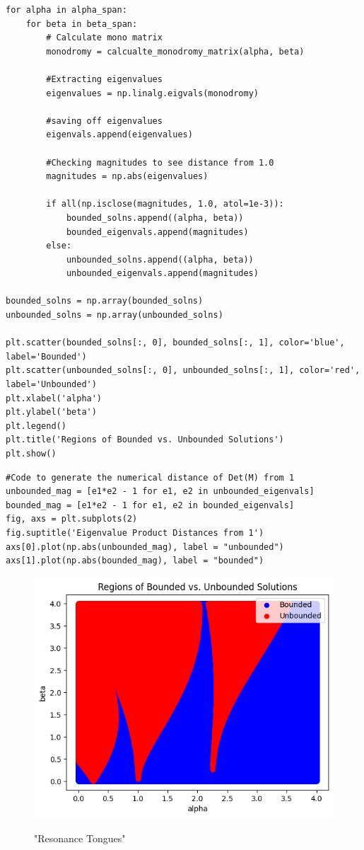 \documentclass[12pt]{article}
\newcommand{\jump}{\vspace{5mm}}
\begin{document}
\begin{enumerate}[]
\begin{lstlisting}
for alpha in alpha_span:
    for beta in beta_span:
        # Calculate mono matrix
        monodromy = calcualte_monodromy_matrix(alpha, beta)
        
        #Extracting eigenvalues
        eigenvalues = np.linalg.eigvals(monodromy)
        
        #saving off eigenvalues
        eigenvals.append(eigenvalues)
        
        #Checking magnitudes to see distance from 1.0
        magnitudes = np.abs(eigenvalues)
        
        if all(np.isclose(magnitudes, 1.0, atol=1e-3)):
            bounded_solns.append((alpha, beta))
            bounded_eigenvals.append(magnitudes)
        else:
            unbounded_solns.append((alpha, beta))
            unbounded_eigenvals.append(magnitudes)
            
bounded_solns = np.array(bounded_solns)
unbounded_solns = np.array(unbounded_solns)

plt.scatter(bounded_solns[:, 0], bounded_solns[:, 1], color='blue', label='Bounded')
plt.scatter(unbounded_solns[:, 0], unbounded_solns[:, 1], color='red', label='Unbounded')
plt.xlabel('alpha')
plt.ylabel('beta')
plt.legend()
plt.title('Regions of Bounded vs. Unbounded Solutions')
plt.show()
\end{lstlisting}

\jump
\begin{lstlisting}
#Code to generate the numerical distance of Det(M) from 1
unbounded_mag = [e1*e2 - 1 for e1, e2 in unbounded_eigenvals]
bounded_mag = [e1*e2 - 1 for e1, e2 in bounded_eigenvals]
fig, axs = plt.subplots(2)
fig.suptitle('Eigenvalue Product Distances from 1')
axs[0].plot(np.abs(unbounded_mag), label = "unbounded")
axs[1].plot(np.abs(bounded_mag), label = "bounded")
\end{lstlisting}

\begin{figure}[ht]
\centering
\includegraphics[scale = 0.8]{Images/bounded_vs_unbounded_solns.png}
\label{png:bounded_vs_unbounded_solns}
\caption{"Resonance Tongues"}
\end{figure}
\vspace{\floatsep}


\end{enumerate}
\end{document}

